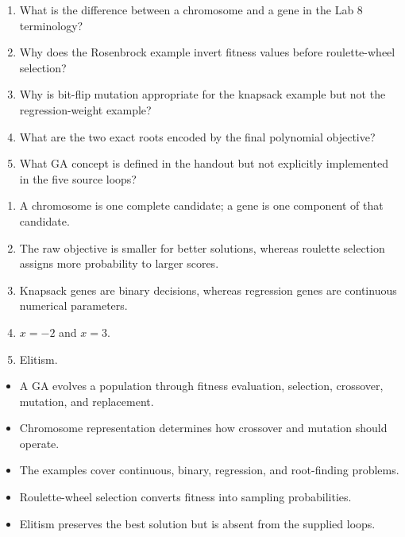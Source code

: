

\clearpage
\begin{quickcheck}
\begin{enumerate}
  \item What is the difference between a chromosome and a gene in the Lab 8 terminology?
  \item Why does the Rosenbrock example invert fitness values before roulette-wheel selection?
  \item Why is bit-flip mutation appropriate for the knapsack example but not the regression-weight example?
  \item What are the two exact roots encoded by the final polynomial objective?
  \item What GA concept is defined in the handout but not explicitly implemented in the five source loops?
\end{enumerate}
\end{quickcheck}

\begin{checkanswers}
\begin{enumerate}
  \item A chromosome is one complete candidate; a gene is one component of that candidate.
  \item The raw objective is smaller for better solutions, whereas roulette selection assigns more probability to larger scores.
  \item Knapsack genes are binary decisions, whereas regression genes are continuous numerical parameters.
  \item \(x=-2\) and \(x=3\).
  \item Elitism.
\end{enumerate}
\end{checkanswers}

\begin{chapterrecap}
\begin{itemize}
  \item A GA evolves a population through fitness evaluation, selection, crossover, mutation, and replacement.
  \item Chromosome representation determines how crossover and mutation should operate.
  \item The examples cover continuous, binary, regression, and root-finding problems.
  \item Roulette-wheel selection converts fitness into sampling probabilities.
  \item Elitism preserves the best solution but is absent from the supplied loops.
\end{itemize}
\end{chapterrecap}
